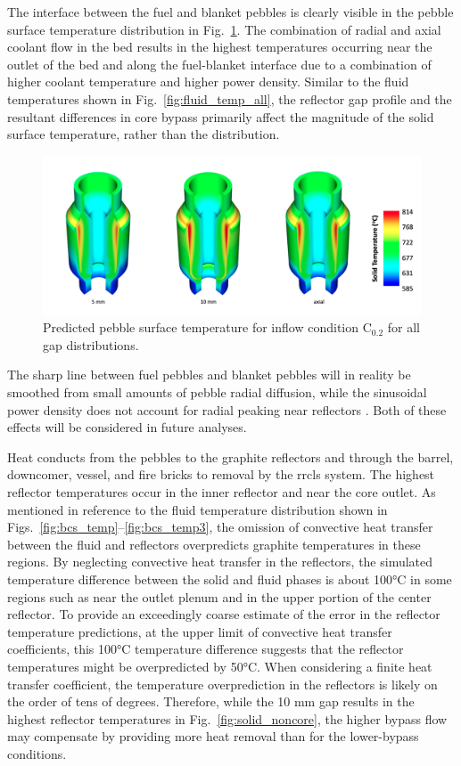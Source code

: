 The interface between the fuel and blanket pebbles is clearly visible in the pebble surface temperature distribution in Fig.\ \ref{fig:solid_core}. The combination of radial and axial coolant flow in the bed results in the highest temperatures occurring near the outlet of the bed and along the fuel-blanket interface due to a combination of higher coolant temperature and higher power density. Similar to the fluid temperatures shown in Fig.\ \ref{fig:fluid_temp_all}, the reflector gap profile and the resultant differences in core bypass primarily affect the magnitude of the solid surface temperature, rather than the distribution. 

\begin{figure}[h!]
\centering
\includegraphics[height=0.4\linewidth]{figs/solid_temp_core.png}
\caption{Predicted pebble surface temperature for inflow condition C$_\text{0.2}$ for all gap distributions.}
\label{fig:solid_core}
\end{figure}

The sharp line between fuel pebbles and blanket pebbles will in reality be smoothed from small amounts of pebble radial diffusion, while the sinusoidal power density does not account for radial peaking near reflectors \cite{xin_wang_thesis}. Both of these effects will be considered in future analyses.

Heat conducts from the pebbles to the graphite reflectors and through the barrel, downcomer, vessel, and fire bricks to removal by the \gls{rrcls} system. The highest reflector temperatures occur in the inner reflector and near the core outlet. As mentioned in reference to the fluid temperature distribution shown in Figs.\ \ref{fig:bcs_temp}--\ref{fig:bcs_temp3}, the omission of convective heat transfer between the fluid and reflectors overpredicts graphite temperatures in these regions. By neglecting convective heat transfer in the reflectors, the simulated temperature difference between the solid and fluid phases is about 100\si{\celsius} in some regions such as near the outlet plenum and in the upper portion of the center reflector. To provide an exceedingly coarse estimate of the error in the reflector temperature predictions, at the upper limit of convective heat transfer coefficients, this 100\si{\celsius} temperature difference suggests that the reflector temperatures might be overpredicted by 50\si{\celsius}. When considering a finite heat transfer coefficient, the temperature overprediction in the reflectors is likely on the order of tens of degrees. Therefore, while the 10 \si{\milli\meter} gap results in the highest reflector temperatures in Fig.\ \ref{fig:solid_noncore}, the higher bypass flow may compensate by providing more heat removal than for the lower-bypass conditions.

